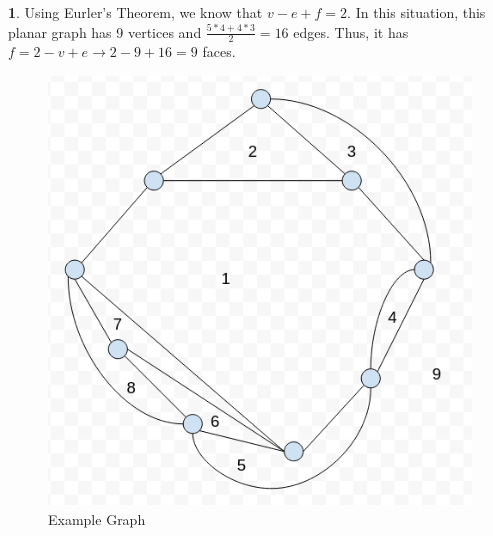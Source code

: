 \documentclass[12pt,a4paper]{article}
\theoremstyle{definition}
\newtheorem{problem}{}
\begin{document}
\begin{problem}

Using Eurler's Theorem, we know that $v - e + f = 2$. In this situation, this planar graph has 9 vertices and $\frac{5*4 + 4*3}{2} = 16$ edges. Thus, it has $f = 2 - v + e \rightarrow 2 - 9 + 16 = 9$ faces.

\begin{figure}[H]
    \centering
    \includegraphics[scale=0.6]{q4.png}
    \caption{Example Graph}
    \label{fig:my_label}
\end{figure}

\end{problem}
\end{document}
